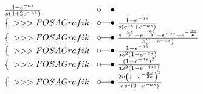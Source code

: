 \[\begin{array}{@{}l@{ ~ \laplace ~ }l@{}}
    \frac{4 - e^{-as}}{s (4 + 2 e^{-as})} \\
\left\lbrace\begin{array}{l}
>>>FOSA Grafik \\
\end{array}\right. &
    \frac{1 - e^{-as}}{s (e^{as} + e^{-as})} \\
\left\lbrace\begin{array}{l}
>>>FOSA Grafik \\
\end{array}\right. &
    \frac{e^{-\frac{as}{\kappa}} - e^{-\frac{as}{\lambda}} + e^{-as} - e^{-\frac{as}{\mu}}}{s (1 - e^{-as})} \\
\left\lbrace\begin{array}{l}
>>>FOSA Grafik \\
\end{array}\right. &
    \frac{1 - e^{-as}}{as^2 (1 + e^{-as})} \\
\left\lbrace\begin{array}{l}
>>>FOSA Grafik \\
\end{array}\right. &
    \frac{(1 - e^{-as})^2}{as^2 (1 - e^{-4as})} \\
\left\lbrace\begin{array}{l}
>>>FOSA Grafik \\
\end{array}\right. &
    \frac{2v \left(1 - e^{-\frac{as}{2v}}\right)^2}{as^2 (1 - e^{-as})} \\
\end{array} \]

